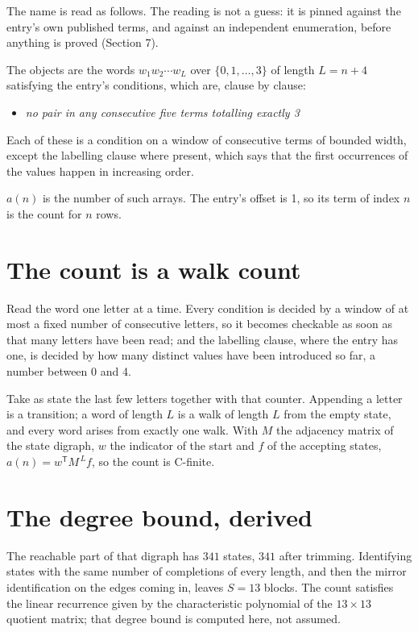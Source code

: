 \documentclass[11pt]{article}
\theoremstyle{definition}
\begin{document}
The name is read as follows. The reading is not a guess: it is pinned against the entry's own published terms, and against an independent enumeration, before anything is proved (Section 7).

The objects are the words $w_1 w_2 \cdots w_L$ over $\{0,1,\dots,3\}$ of length $L = n + 4$ satisfying the entry's conditions, which are, clause by clause:

\begin{itemize}

\item {\itshape no pair in any consecutive five terms totalling exactly 3}

\end{itemize}

Each of these is a condition on a window of consecutive terms of bounded width, except the labelling clause where present, which says that the first occurrences of the values happen in increasing order.

$a(n)$ is the number of such arrays. The entry's offset is 1, so its term of index $n$ is the count for $n$ rows.

\section{The count is a walk count}

Read the word one letter at a time. Every condition is decided by a window of at most a fixed number of consecutive letters, so it becomes checkable as soon as that many letters have been read; and the labelling clause, where the entry has one, is decided by how many distinct values have been introduced so far, a number between $0$ and 4.

Take as state the last few letters together with that counter. Appending a letter is a transition; a word of length $L$ is a walk of length $L$ from the empty state, and every word arises from exactly one walk. With $M$ the adjacency matrix of the state digraph, $w$ the indicator of the start and $f$ of the accepting states, $a(n) = w^{\mathsf T}M^{\,L}f$, so the count is C-finite.

\section{The degree bound, derived}

The reachable part of that digraph has $341$ states, $341$ after trimming. Identifying states with the same number of completions of every length, and then the mirror identification on the edges coming in, leaves $S = 13$ blocks. The count satisfies the linear recurrence given by the characteristic polynomial of the $13\times13$ quotient matrix; that degree bound is computed here, not assumed.
\end{document}
